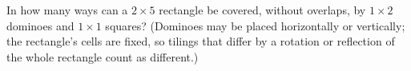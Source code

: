 In how many ways can a $2\times5$ rectangle be covered, without overlaps, by $1\times2$ dominoes and $1\times1$ squares? (Dominoes may be placed horizontally or vertically; the rectangle's cells are fixed, so tilings that differ by a rotation or reflection of the whole rectangle count as different.)
